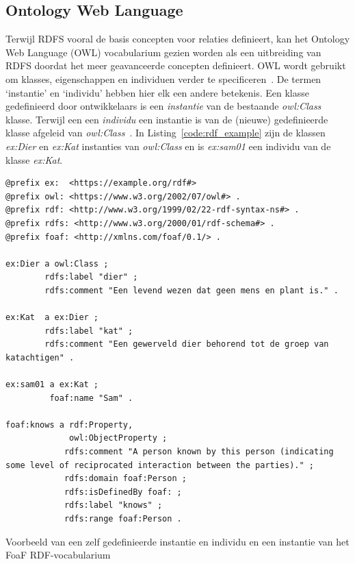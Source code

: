\subsection{Ontology Web Language}
Terwijl RDFS vooral de basis concepten voor relaties definieert, kan het Ontology Web Language (OWL) vocabularium gezien worden als een uitbreiding van RDFS doordat het meer geavanceerde concepten definieert.
OWL wordt gebruikt om klasses, eigenschappen en individuen verder te specificeren~\cite{verborgh_webfundamental}.
De termen `instantie' en `individu' hebben hier elk een andere betekenis. Een klasse gedefinieerd door ontwikkelaars is een \textit{instantie} van de bestaande \textit{owl:Class} klasse. Terwijl een een \textit{individu} een instantie is van de (nieuwe) gedefinieerde klasse afgeleid van \textit{owl:Class}~\cite{owl}.
In Listing~\ref{code:rdf_example} zijn de klassen \textit{ex:Dier} en \textit{ex:Kat} instanties van \textit{owl:Class} en is \textit{ex:sam01} een individu van de klasse \textit{ex:Kat}.

\begin{code}
\begin{verbatim}
@prefix ex:  <https://example.org/rdf#>
@prefix owl: <https://www.w3.org/2002/07/owl#> .
@prefix rdf: <http://www.w3.org/1999/02/22-rdf-syntax-ns#> .
@prefix rdfs: <http://www.w3.org/2000/01/rdf-schema#> .
@prefix foaf: <http://xmlns.com/foaf/0.1/> .

ex:Dier a owl:Class ;
        rdfs:label "dier" ;
        rdfs:comment "Een levend wezen dat geen mens en plant is." .
        
ex:Kat  a ex:Dier ;
        rdfs:label "kat" ;
        rdfs:comment "Een gewerveld dier behorend tot de groep van katachtigen" .
        
ex:sam01 a ex:Kat ;
         foaf:name "Sam" .

foaf:knows a rdf:Property,
             owl:ObjectProperty ;
            rdfs:comment "A person known by this person (indicating some level of reciprocated interaction between the parties)." ;
            rdfs:domain foaf:Person ;
            rdfs:isDefinedBy foaf: ;
            rdfs:label "knows" ;
            rdfs:range foaf:Person .
\end{verbatim}
\caption{Voorbeeld van een zelf gedefinieerde instantie en individu en een instantie van het FoaF RDF-vocabularium}
\label{code:rdf_example}
\end{code}

